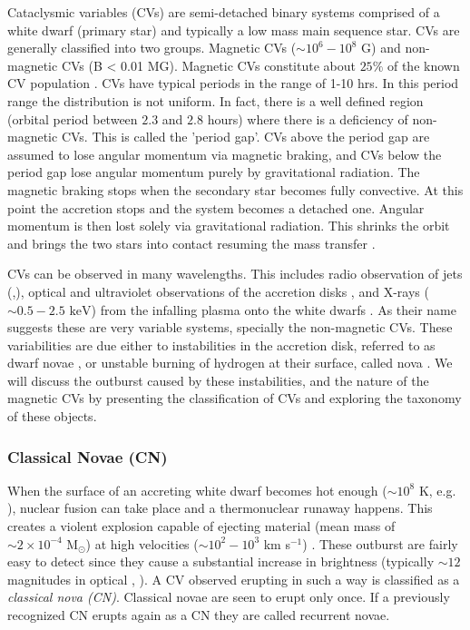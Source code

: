 Cataclysmic variables (CVs) are semi-detached binary systems comprised of a white dwarf (primary star) and typically a low mass main sequence star. CVs are generally classified into two groups. Magnetic CVs ($\sim 10^6 - 10^8$ G) and non-magnetic CVs (B < 0.01 MG). Magnetic CVs constitute about $25 \%$ of the known CV population \citep{balman_x-ray_2012}. CVs have typical periods in the range of 1-10 hrs. In this period range the distribution is not uniform. In fact, there is a well defined region (orbital period between $2.3$ and $2.8$ hours) where there is a deficiency of non-magnetic CVs. This is called the 'period gap'. CVs above the period gap are assumed to lose  angular momentum via magnetic braking, and CVs below the period gap lose angular momentum purely by gravitational radiation. The magnetic braking  stops when the secondary star becomes fully convective. At this point the accretion stops and the system becomes a detached one. Angular momentum is then lost solely via gravitational radiation. This shrinks the orbit and brings the two stars into contact resuming the mass transfer \citep[e.g.][]{warner_cataclysmic_2003}.

CVs can be observed in many wavelengths. This includes radio observation of jets (\citealt{nova_jets_2008},\citealt{coppejans_novalike_2015}), optical and ultraviolet observations of the accretion disks \citep{1994ASPC...54...61K}, and X-rays ($\sim 0.5-2.5 \text{ keV}$) from the infalling plasma onto the white dwarfs \citep{verbunt_cataclysmic_1997}. As their name suggests these are very variable systems, specially the non-magnetic CVs. These variabilities are due either to instabilities in the accretion disk, referred to as dwarf novae \citep{osaki_accretion_1974}, or unstable burning of hydrogen at their surface, called nova \citep{starrfield_thermonuclear_2016}. We will discuss the outburst caused by these instabilities, and the nature of the magnetic CVs by presenting the classification of CVs and exploring the taxonomy of these objects.  


\subsubsection{Classical Novae (CN)}

When the surface of an accreting white dwarf becomes hot enough ($\sim 10^8$ K, e.g. \cite{starrfield_thermonuclear_2016}), nuclear fusion can take place and a thermonuclear runaway happens. This creates a violent explosion capable of ejecting material (mean mass of $\sim 2 \times 10^{-4} \text{ M}_\odot$) at high velocities ($\sim 10^2 - 10^3$ km s$^{-1}$) \citep{gehrz_nucleosynthesis_1998,shara_recent_1989}. These outburst are fairly easy to detect since they cause a substantial increase in brightness (typically $\sim 12$ magnitudes in optical , \citealt{shara_recent_1989}). A CV observed erupting in such a way is classified as a \emph{classical nova (CN)}. Classical novae are seen to erupt only once. If a previously recognized CN erupts again as a CN they are called recurrent novae. 

